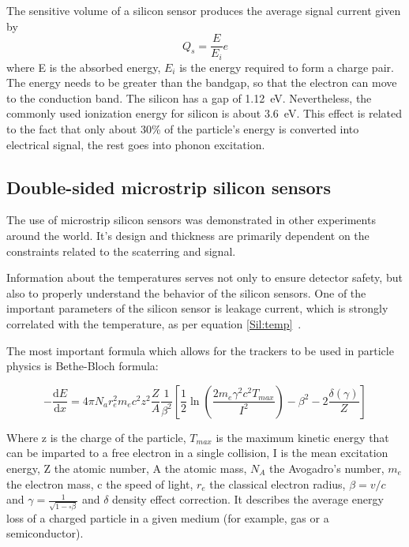 The sensitive volume of a silicon sensor produces the average signal current given by 
\begin{equation}
    Q_{s} = \frac{E}{E_{i}}e
\end{equation}
where E is the absorbed energy, $E_{i}$ is the energy required to form a charge pair. The energy needs to be greater than the bandgap, so that the electron can move to the conduction band. The silicon has a gap of 1.12~eV. Nevertheless, the commonly used ionization energy for silicon is about 3.6~eV. This effect is related to the fact that only about 30\% of the particle's energy is converted into electrical signal, the rest goes into phonon excitation.

\subsection{Double-sided microstrip silicon sensors}
\label{sensors}
The use of microstrip silicon sensors was demonstrated in other experiments around the world. It's design and thickness are primarily dependent on the constraints related to the scaterring and signal.

Information about the temperatures serves not only to ensure detector safety, but also to properly understand the behavior of the silicon sensors. One of the important parameters of the silicon sensor is leakage current, which is strongly correlated with the temperature, as per equation \ref{Sil:temp}~\cite{Hartmann:2017gzy}.

The most important formula which allows for the trackers to be used in particle physics is Bethe-Bloch formula:

\begin{equation}
-\dfrac{\mathrm dE}{\mathrm dx} = 4 \pi N_{a} r_{e}^{2} m_{e} c^{2} z^{2}  \dfrac{Z}{A} \frac{1}{\beta^{2}} [\frac{1}{2}\ln(\frac{2m_{e}\gamma^{2}c^{2} T_{max}}{I^{2}}) - \beta^{2} -  2\frac{\delta(\gamma)}{Z}]
\end{equation}

Where z is the charge of the particle, $T_{max}$ is the maximum kinetic energy that can be imparted to a free electron in a single collision, I is the mean excitation energy, Z the atomic number, A the atomic mass, $N_{A}$ the Avogadro’s number, $m_{e}$ the electron mass, c the speed of light, $r_{e}$ the classical electron radius, $\beta = v/c$ and $\gamma = \frac{1}{\sqrt{1-\square\beta}}$ and $\delta$ density effect correction. It describes the average energy loss of a charged particle in a given medium (for example, gas or a semiconductor). 

